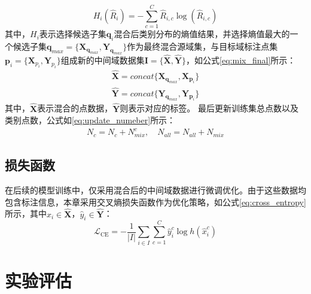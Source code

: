     \begin{equation}
        \label{eq:class_entropy}
        H_i(\hat{R}_{i})=-\sum_{c=1}^{C} \hat{R}_{i,c}\log(\hat{R}_{i,c})
    \end{equation}
    其中，$H_i$表示选择候选子集$\mathbf{q}_i$混合后类别分布的熵值结果，并选择熵值最大的一个候选子集$\mathbf{q}_{max}=\{\mathbf{X}_{\mathbf{q}_{max}},\mathbf{Y}_{\mathbf{q}_{max}}\}$作为最终混合源域集，与目标域标注点集$\mathbf{p}_i=\{\mathbf{X}_{p_i},\mathbf{Y}_{p_i}\}$组成新的中间域数据集$\mathbf{I}=\{\mathbf{\hat{X},\hat{Y}}\}$，如公式\eqref{eq:mix_final}所示：
    \begin{equation}
        \label{eq:mix_final}
        \begin{aligned}
            \mathbf{\hat{X}}=concat\{\mathbf{X}_{\mathbf{q}_{max}},\mathbf{X}_{\mathbf{p}_i}\}
            \\
        \mathbf{\hat{Y}}=concat\{\mathbf{Y}_{\mathbf{q}_{max}},\mathbf{Y}_{\mathbf{p}_i}\}
        \end{aligned}
    \end{equation}
    其中，$\mathbf{\hat{X}}$表示混合的点数据，$\mathbf{\hat{Y}}$则表示对应的标签。%
    最后更新训练集总点数以及类别点数，公式如\eqref{eq:update_numeber}所示：
    \begin{equation}
        \label{eq:update_numeber}
        \begin{aligned}
            N_c=N_c+N^c_{mix}, \quad
            N_{all}=N_{all}+N_{mix}
        \end{aligned}
    \end{equation}
    
    \subsection{损失函数}
    在后续的模型训练中，仅采用混合后的中间域数据进行微调优化。由于这些数据均包含标注信息，本章采用交叉熵损失函数作为优化策略，如公式\eqref{eq:cross_entropy}所示，其中$\hat{x}_{i} \in \hat{\mathbf{X}}$，$\hat{y}_{i} \in \hat{\mathbf{Y}}$：
    \begin{equation}
        \label{eq:cross_entropy}
        \mathcal{L}_{\text{CE}} = - \frac{1}{|I|} \sum_{i \in I} \sum_{c=1}^{C} \hat{y}_{i}^{c} \log h(\hat{x}_{i}^{c})
    \end{equation}

    \section{实验评估}
